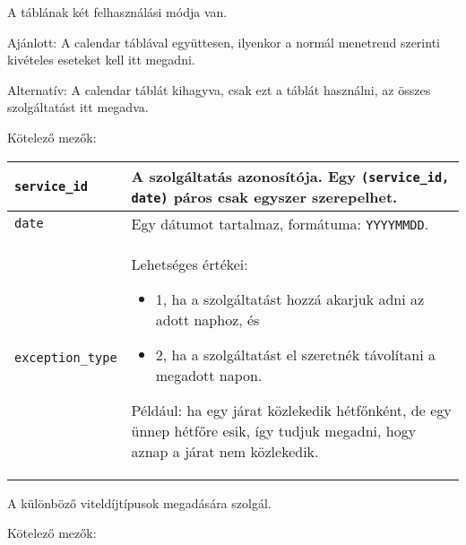 
A táblának két felhasználási módja van.

Ajánlott: A calendar táblával együttesen, ilyenkor a normál menetrend szerinti kivételes eseteket kell itt megadni.

Alternatív: A calendar táblát kihagyva, csak ezt a táblát használni, az összes szolgáltatást itt megadva. 

\medskip

\noindent Kötelező mezők:

\bigskip

\begin{tabular}{|p{3.5cm}|p{10cm}|}
\hline
\texttt{service\_id} & A szolgáltatás azonosítója. Egy \texttt{(service\_id, date)} páros csak egyszer szerepelhet. \\
\hline
\texttt{date} & Egy dátumot tartalmaz, formátuma: \texttt{YYYYMMDD}. \\
\hline
\texttt{exception\_type} & Lehetséges értékei:
\begin{itemize}
\item 1, ha a szolgáltatást hozzá akarjuk adni az adott naphoz, és
\item 2, ha a szolgáltatást el szeretnék távolítani a megadott napon.
\end{itemize}
Például: ha egy járat közlekedik hétfőnként, de egy ünnep hétfőre esik, így tudjuk megadni, hogy aznap a járat nem közlekedik. \\
\hline
\end{tabular}

\newpage


A különböző viteldíjtípusok megadására szolgál.

\medskip

\noindent Kötelező mezők:

\bigskip

